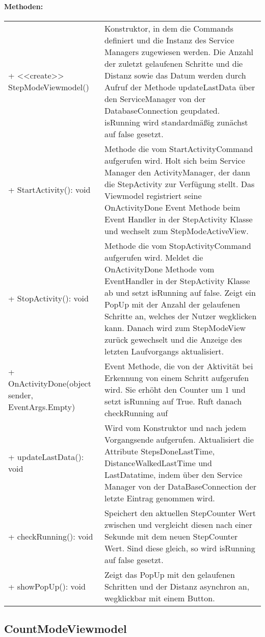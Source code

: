 \documentclass[a4paper,12pt]{article}
\begin{document}
\paragraph{Methoden:}
\begin{tabular}{p{7cm}p{10cm}}
+ <<create>> StepModeViewmodel() & Konstruktor, in dem die Commands definiert und die Instanz des Service Managers zugewiesen werden. Die Anzahl der zuletzt gelaufenen Schritte und die Distanz sowie das Datum werden durch Aufruf der Methode updateLastData über den ServiceManager von der DatabaseConnection geupdated. isRunning wird standardmäßig zunächst auf false gesetzt.\\
+ StartActivity(): void & Methode die vom StartActivityCommand aufgerufen wird. Holt sich beim Service Manager den ActivityManager, der dann die StepActivity zur Verfügung stellt. Das Viewmodel registriert seine OnActivityDone Event Methode beim Event Handler in der StepActivity Klasse und wechselt zum StepModeActiveView. \\
+ StopActivity(): void & Methode die vom StopActivityCommand aufgerufen wird. Meldet die OnActivityDone Methode vom EventHandler in der StepActivity Klasse ab und setzt isRunning auf false. Zeigt ein PopUp mit der Anzahl der gelaufenen Schritte an, welches der Nutzer wegklicken kann. Danach wird zum StepModeView zurück gewechselt und die Anzeige des letzten Laufvorgangs aktualisiert. \\
+ OnActivityDone(object sender, EventArgs.Empty) & Event Methode, die von der Aktivität bei Erkennung von einem Schritt aufgerufen wird. Sie erhöht den Counter um 1 und setzt isRunning auf True. Ruft danach checkRunning auf \\
+ updateLastData(): void & Wird vom Konstruktor und nach jedem Vorgangsende aufgerufen. Aktualisiert die Attribute StepsDoneLastTime, DistanceWalkedLastTime und LastDatatime, indem über den Service Manager von der DataBaseConnection der letzte Eintrag genommen wird. \\
+ checkRunning(): void & Speichert den aktuellen StepCounter Wert zwischen und vergleicht diesen nach einer Sekunde mit dem neuen StepCounter Wert. Sind diese gleich, so wird isRunning auf false gesetzt. \\
+ showPopUp(): void & Zeigt das PopUp mit den gelaufenen Schritten und der Distanz asynchron an, wegklickbar mit einem Button. \\
\end{tabular}

\subsection{CountModeViewmodel}
\end{document}
